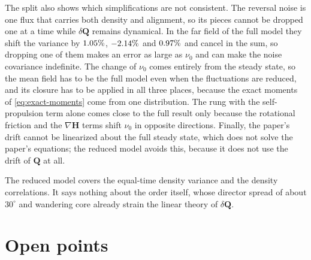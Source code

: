 \documentclass[11pt,a4paper]{article}
\newenvironment{updenv}{\color{OliveGreen}}{}
\newcommand{\upd}[1]{{\color{OliveGreen}#1}}
\newcommand{\Q}{\mathbf{Q}}
\renewcommand{\H}{\mathbf{H}}
\begin{document}
\begin{updenv}
The split also shows which simplifications are not consistent. The reversal noise is one
flux that carries both density and alignment, so its pieces cannot be dropped one at a time
while $\delta\Q$ remains dynamical. In the far field of the full model they shift the
variance by $1.05\%$, $-2.14\%$ and $0.97\%$ and cancel in the
sum, so dropping one of them makes an error as large as $\nu_0$ and can make the noise
covariance indefinite. The change of $\nu_0$ comes entirely from the steady state, so the
mean field has to be the full model even when the fluctuations are reduced, and its closure
has to be applied in all three places, because the exact moments of
\cref{eq:exact-moments} come from one distribution. The rung with the self-propulsion term
alone comes close to the full result only because the rotational friction and \upd{the $\nabla\H$
terms} shift $\nu_0$ in opposite directions. Finally, the paper's drift cannot be linearized
about the full steady state, which does not solve the paper's equations; the reduced model
avoids this, because it does not use the drift of $\Q$ at all.

The reduced model covers the equal-time density variance and the density correlations. It
says nothing about the order itself, whose director spread of about $30^\circ$ and wandering
core already strain the linear theory of $\delta\Q$.
\end{updenv}

\section{Open points}
\label{sec:open}
\end{document}
